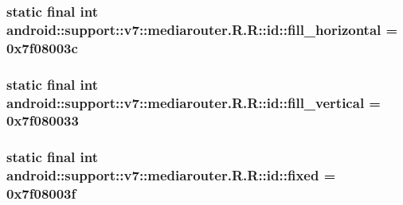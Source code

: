 \hypertarget{classandroid_1_1support_1_1v7_1_1mediarouter_1_1_r_1_1id_1858edf69f5c5596dd94f74f1039cfde}{
\subsubsection[{fill\_\-horizontal}]{\setlength{\rightskip}{0pt plus 5cm}static final int android::support::v7::mediarouter.R.R::id::fill\_\-horizontal = 0x7f08003c}}
\label{classandroid_1_1support_1_1v7_1_1mediarouter_1_1_r_1_1id_1858edf69f5c5596dd94f74f1039cfde}


\hypertarget{classandroid_1_1support_1_1v7_1_1mediarouter_1_1_r_1_1id_0f3914b3f32a7d504bb432cd3ca0742a}{
\subsubsection[{fill\_\-vertical}]{\setlength{\rightskip}{0pt plus 5cm}static final int android::support::v7::mediarouter.R.R::id::fill\_\-vertical = 0x7f080033}}
\label{classandroid_1_1support_1_1v7_1_1mediarouter_1_1_r_1_1id_0f3914b3f32a7d504bb432cd3ca0742a}


\hypertarget{classandroid_1_1support_1_1v7_1_1mediarouter_1_1_r_1_1id_7d91f5a1b952e0e5651deae353ce60cc}{
\subsubsection[{fixed}]{\setlength{\rightskip}{0pt plus 5cm}static final int android::support::v7::mediarouter.R.R::id::fixed = 0x7f08003f}}
\label{classandroid_1_1support_1_1v7_1_1mediarouter_1_1_r_1_1id_7d91f5a1b952e0e5651deae353ce60cc}


